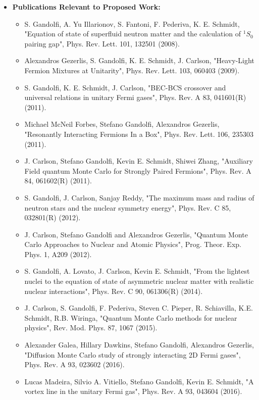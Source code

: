 \documentclass[11pt]{article}
\begin{document}
\begin{itemize}
\item{\bf Publications Relevant to Proposed Work:}
\begin{itemize}
\item S. Gandolfi, A. Yu Illarionov, S. Fantoni, F. Pederiva, K. E. Schmidt, 
"Equation of state of superfluid neutron matter and the calculation of $^1S_0$ pairing gap", 
Phys. Rev. Lett. 101, 132501 (2008).
\item Alexandros Gezerlis, S. Gandolfi, K. E. Schmidt, J. Carlson, 
"Heavy-Light Fermion Mixtures at Unitarity", 
Phys. Rev. Lett. 103, 060403 (2009).
\item S. Gandolfi, K. E. Schmidt, J. Carlson,
"BEC-BCS crossover and universal relations in unitary Fermi gases",
Phys. Rev. A 83, 041601(R) (2011).
\item Michael McNeil Forbes, Stefano Gandolfi, Alexandros Gezerlis,
"Resonantly Interacting Fermions In a Box",
Phys. Rev. Lett. 106, 235303 (2011).
\item J. Carlson, Stefano Gandolfi, Kevin E. Schmidt, Shiwei Zhang,
"Auxiliary Field quantum Monte Carlo for Strongly Paired Fermions",
Phys. Rev. A 84, 061602(R) (2011).
\item S. Gandolfi, J. Carlson, Sanjay Reddy,
"The maximum mass and radius of neutron stars and the nuclear symmetry energy",
Phys. Rev. C 85, 032801(R) (2012).
\item J. Carlson, Stefano Gandolfi and Alexandros Gezerlis,
"Quantum Monte Carlo Approaches to Nuclear and Atomic Physics",
Prog. Theor. Exp. Phys. 1, A209 (2012).
\item S. Gandolfi, A. Lovato, J. Carlson, Kevin E. Schmidt,
"From the lightest nuclei to the equation of state of asymmetric nuclear matter with realistic nuclear interactions",
Phys. Rev. C 90, 061306(R) (2014).
\item J. Carlson, S. Gandolfi, F. Pederiva, Steven C. Pieper, R. Schiavilla, K.E. Schmidt, R.B. Wiringa,
"Quantum Monte Carlo methods for nuclear physics",
Rev. Mod. Phys. 87, 1067 (2015).
\item Alexander Galea, Hillary Dawkins, Stefano Gandolfi, Alexandros Gezerlis,
"Diffusion Monte Carlo study of strongly interacting 2D Fermi gases",
Phys. Rev. A 93, 023602 (2016).
\item Lucas Madeira, Silvio A. Vitiello, Stefano Gandolfi, Kevin E. Schmidt,
"A vortex line in the unitary Fermi gas",
Phys. Rev. A 93, 043604 (2016).
\end{itemize}
 

\end{itemize}
\end{document}
